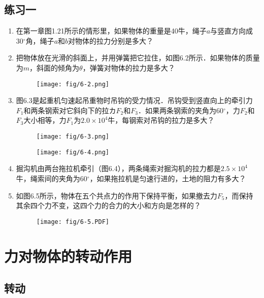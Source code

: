 \subsection*{练习一}

\begin{enumerate}
    \item 在第一章图1.21所示的情形里，如果物体的重量是40牛，绳子$a$与竖直方向成30$^\circ$角，绳子$a$和$b$对物体的拉力分别是多大？
    \item 把物体放在光滑的斜面上，并用弹簧把它拉住，如图6.2所示．如果物体的质量为$m$，斜面的倾角为$\theta$，弹簧对物体的拉力是多大？
\begin{figure}[htp]
\centering\texttt{[image: fig/6-2.png]}
\caption{}
\end{figure}

    \item 图6.3是起重机匀速起吊重物时吊钩的受力情况．吊钩受到竖直向上的牵引力$F_1$和两条钢索对它斜向下的拉カ$F_2$和$F_3$．如果两条钢索的夹角为60$^\circ$，力$F_2$和$F_3$大小相等，力$F_1$为$2.0\times 10^4$牛，每钢索对吊钩的拉力是多大？

\begin{figure}[htp]\centering
\begin{minipage}[t]{0.48\textwidth}
\centering\texttt{[image: fig/6-3.png]}
\caption{}
\end{minipage}
\begin{minipage}[t]{0.48\textwidth}
\centering\texttt{[image: fig/6-4.png]}
\caption{}
\end{minipage}
\end{figure}
    \item 掘沟机由两台拖拉机牵引（图6.4），两条绳索对掘沟机的拉力都是$2.5\times 10^4$牛，绳索间的夹角为60$^\circ$，如果拖拉机是匀速行进的，土地的阻力有多大？

    \item 如图6.5所示，物体在五个共点力的作用下保持平衡，如果撤去力$F_5$，而保持其余四个力不变，这四个力的合力的大小和方向是怎样的？
\begin{figure}[htp]
\centering\texttt{[image: fig/6-5.PDF]}
\caption{}
\end{figure}
\end{enumerate}

\section{力对物体的转动作用}
\subsection{转动}

